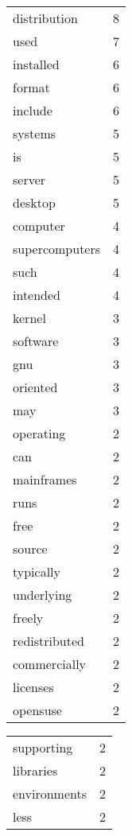 \begin{center}
\begin{scriptsize}
\begin{tabular}{|ll|}
\hline
distribution   & 8\\%
used           & 7\\%
installed      & 6\\%
format         & 6\\%
include        & 6\\%
systems        & 5\\%
is             & 5\\%
server         & 5\\%
desktop        & 5\\%
computer       & 4\\%
supercomputers & 4\\%
such           & 4\\%
intended       & 4\\%
kernel         & 3\\%
software       & 3\\%
gnu            & 3\\%
oriented       & 3\\%
may            & 3\\%
operating      & 2\\%
can            & 2\\%
mainframes     & 2\\%
runs           & 2\\%
free           & 2\\%
source         & 2\\%
typically      & 2\\%
underlying     & 2\\%
freely         & 2\\%
redistributed  & 2\\%
commercially   & 2\\%
licenses       & 2\\%
opensuse       & 2\\%
\hline
\end{tabular}
\begin{tabular}{|ll|}
\hline
supporting     & 2\\%
libraries      & 2\\%
environments   & 2\\%
less           & 2\\%

\end{tabular}
\end{scriptsize}
\end{center}
